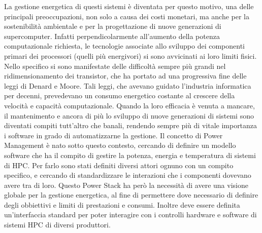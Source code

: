 La gestione energetica di questi sistemi è diventata per questo motivo, una delle principali preoccupazioni, non solo a causa dei costi monetari, ma anche per la sostenibilità ambientale e per la progettazione di nuove generazioni di supercomputer\cite{TODO}. Infatti perpendicolarmente all'aumento della potenza computazionale richiesta, le tecnologie associate allo sviluppo dei componenti primari dei processori (quelli più energivori) si sono avvicinati ai loro limiti fisici.
Nello specifico si sono manifestate delle difficoltà sempre più grandi nel ridimensionamento dei transistor, che ha portato ad una progressiva fine delle leggi di Denard e Moore\cite{TODO}. Tali leggi, che avevano guidato l'industria informatica per decenni, prevedevano un consumo energetico costante al crescere della velocità e capacità computazionale. Quando la loro efficacia è venuta a mancare, il mantenimento e ancora di più lo sviluppo di nuove generazioni di sistemi sono diventati compiti tutt'altro che banali, rendendo sempre più di vitale importanza i software in grado di automatizzarne la gestione. %
Il concetto di Power Management è nato sotto questo contesto, cercando di definire un modello software che ha il compito di gestire la potenza, energia e temperatura di sistemi di HPC. Per farlo sono stati definiti diversi attori ognuno con un compito specifico, e cercando di standardizzare le interazioni che i componenti dovevano avere tra di loro.
Questo Power Stack ha però la necessità di avere una visione globale per la gestione energetica, al fine di permettere dove necessario di definire degli obbiettivi e limiti di prestazioni e consumi. Inoltre deve essere definita un'interfaccia standard per poter interagire con i controlli hardware e software di sistemi HPC di diversi produttori.
